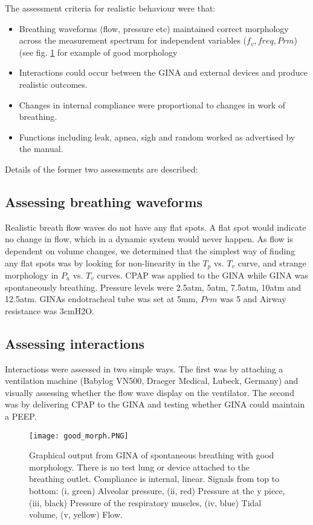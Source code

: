 \documentclass[12pt, openany, oneside]{book}
\begin{document}
The assessment criteria for realistic behaviour were that:
\begin{itemize}
\item Breathing waveforms (flow, pressure etc) maintained correct morphology across the measurement spectrum for independent variables ($f_v, freq, Prm$) (see fig. \ref{fig:goodmorph} for example of good morphology
\item Interactions could occur between the GINA and external devices and produce realistic outcomes.
\item Changes in internal compliance were proportional to changes in work of breathing.
\item Functions including leak, apnea, sigh and random worked as advertised by the manual.
\end{itemize}

Details of the former two assessments are described:

\subsection{Assessing breathing waveforms}
Realistic breath flow waves do not have any flat spots. A flat spot would indicate no change in flow, which in a dynamic system would never happen. As flow is dependent on volume changes, we determined that the simplest way of finding any flat spots was by looking for non-linearity in the $T_p$ vs. $T_v$ curve, and strange morphology in $P_a$ vs. $T_v$ curves. CPAP was applied to the GINA while GINA was spontaneously breathing. Pressure levels were 2.5atm, 5atm, 7.5atm, 10atm and 12.5atm. GINAs endotracheal tube was set at 5mm, $Prm$ was 5 and Airway resistance was 3cmH2O. 

\subsection{Assessing interactions}
Interactions were assessed in two simple ways. The first was by attaching a ventilation machine (Babylog VN500, Draeger Medical, Lubeck, Germany) and visually assessing whether the flow wave display on the ventilator. The second was by delivering CPAP to the GINA and testing whether GINA could maintain a PEEP.


\begin{figure}
\centering
\texttt{[image: good\_morph.PNG]}		
	\caption[GINA spontaneous breaths with good morphology]{Graphical output from GINA of spontaneous breathing with good morphology. There is no test lung or device attached to the breathing outlet. Compliance is internal, linear. Signals from top to bottom: (i, green) Alveolar pressure, (ii, red) Pressure at the y piece, (iii, black) Pressure of the respiratory muscles, (iv, blue) Tidal volume, (v, yellow) Flow. }
	\label{fig:goodmorph}
\end{figure}
\end{document}
